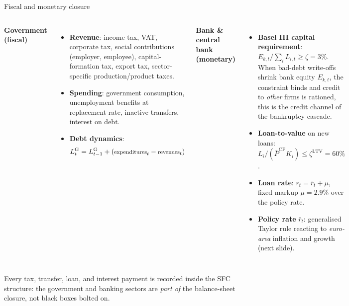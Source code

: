 \documentclass[9pt]{beamer}
\begin{document}
\begin{frame}{Fiscal and monetary closure}
    \begin{columns}[T]
    \textbf{Government (fiscal)}
    \begin{itemize}\footnotesize
        \item \textbf{Revenue}: income tax, VAT, corporate tax, social contributions (employer, employee), capital-formation tax, export tax, sector-specific production/product taxes.
        \item \textbf{Spending}: government consumption, unemployment benefits at replacement rate, inactive transfers, interest on debt.
        \item \textbf{Debt dynamics}:
        \begin{equation*}\footnotesize
            L^{\mathrm{G}}_t = L^{\mathrm{G}}_{t-1} + (\text{expenditures}_t - \text{revenues}_t)
        \end{equation*}
    \end{itemize}

    \textbf{Bank \& central bank (monetary)}
    \begin{itemize}\footnotesize
        \item \textbf{Basel III capital requirement}:
        $E_{k,t}/\sum_i L_{i,t} \geq \zeta = 3\%$. When bad-debt write-offs shrink bank equity $E_{k,t}$, the constraint binds and credit to \emph{other} firms is rationed, this is the credit channel of the bankruptcy cascade.
        \item \textbf{Loan-to-value} on new loans: $L_i/(\bar{P}^{\mathrm{CF}} K_i) \leq \zeta^{\mathrm{LTV}} = 60\%$.
        \item \textbf{Loan rate}: $r_t = \bar{r}_t + \mu$, fixed markup $\mu = 2.9\%$ over the policy rate.
        \item \textbf{Policy rate} $\bar{r}_t$: generalised Taylor rule reacting to \emph{euro-area} inflation and growth (next slide).
    \end{itemize}
    \end{columns}
    \vspace{0.4em}
    \footnotesize
    Every tax, transfer, loan, and interest payment is recorded inside the SFC structure: the government and banking sectors are \emph{part of} the balance-sheet closure, not black boxes bolted on.
\end{frame}
\end{document}
